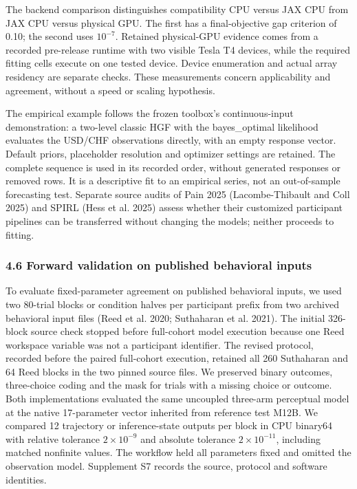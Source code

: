 \documentclass[
  11pt,
]{article}
\begin{document}
The backend comparison distinguishes compatibility CPU versus JAX CPU
from JAX CPU versus physical GPU. The first has a final-objective gap
criterion of 0.10; the second uses \(10^{-7}\). Retained physical-GPU
evidence comes from a recorded pre-release runtime with two visible
Tesla T4 devices, while the required fitting cells execute on one tested
device. Device enumeration and actual array residency are separate
checks. These measurements concern applicability and agreement, without
a speed or scaling hypothesis.

The empirical example follows the frozen toolbox's continuous-input
demonstration: a two-level classic HGF with the bayes\_optimal
likelihood evaluates the USD/CHF observations directly, with an empty
response vector. Default priors, placeholder resolution and optimizer
settings are retained. The complete sequence is used in its recorded
order, without generated responses or removed rows. It is a descriptive
fit to an empirical series, not an out-of-sample forecasting test.
Separate source audits of Pain 2025 (Lacombe-Thibault and Coll 2025) and
SPIRL (Hess et al. 2025) assess whether their customized participant
pipelines can be transferred without changing the models; neither
proceeds to fitting.

\subsubsection{4.6 Forward validation on published behavioral
inputs}\label{forward-validation-on-published-behavioral-inputs}

To evaluate fixed-parameter agreement on published behavioral inputs, we
used two 80-trial blocks or condition halves per participant prefix from
two archived behavioral input files (Reed et al. 2020; Suthaharan et al.
2021). The initial 326-block source check stopped before full-cohort
model execution because one Reed workspace variable was not a
participant identifier. The revised protocol, recorded before the paired
full-cohort execution, retained all 260 Suthaharan and 64 Reed blocks in
the two pinned source files. We preserved binary outcomes, three-choice
coding and the mask for trials with a missing choice or outcome. Both
implementations evaluated the same uncoupled three-arm perceptual model
at the native 17-parameter vector inherited from reference test M12B. We
compared 12 trajectory or inference-state outputs per block in CPU
binary64 with relative tolerance \(2\times10^{-9}\) and absolute
tolerance \(2\times10^{-11}\), including matched nonfinite values. The
workflow held all parameters fixed and omitted the observation model.
Supplement S7 records the source, protocol and software identities.
\end{document}

